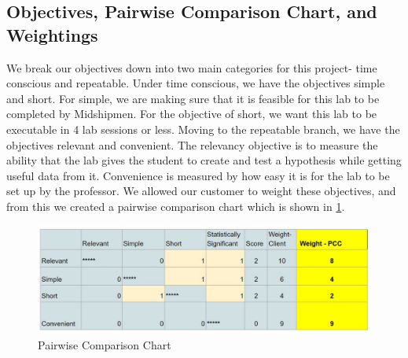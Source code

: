 \documentclass{article}
\begin{document}
\subsection{Objectives, Pairwise Comparison Chart, and Weightings}
\par We break our objectives down into two main categories for this project- time conscious and repeatable. Under time conscious, we have the objectives simple and short. For simple, we are making sure that it is feasible for this lab to be completed by Midshipmen. For the objective of short, we want this lab to be executable in 4 lab sessions or less. Moving to the repeatable branch, we have the objectives relevant and convenient. The relevancy objective is to measure the ability that the lab gives the student to create and test a hypothesis while getting useful data from it. Convenience is measured by how easy it is for the lab to be set up by the professor. We allowed our customer to weight these objectives, and from this we created a pairwise comparison chart which is shown in \ref{fig:pcc}. 

\begin{figure}[ht!]
\centering
\includegraphics[scale=0.55]{PCC.JPG}
\caption{Pairwise Comparison Chart}
\label{fig:pcc}
\end{figure}
\end{document}

